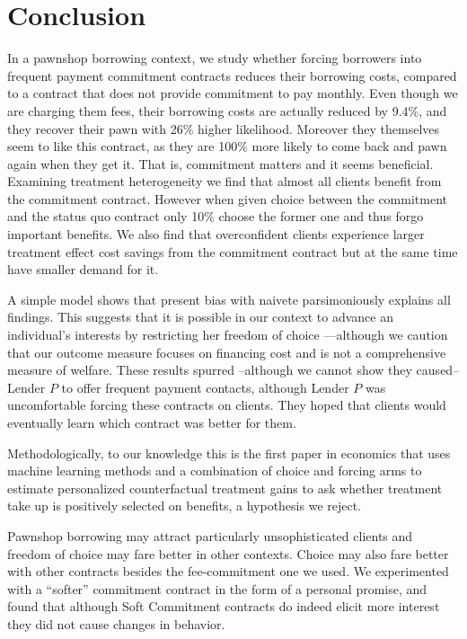 \documentclass[oneside,11pt]{article}
\begin{document}
    
\section{Conclusion} \label{conclusion}

In a pawnshop borrowing context, we study whether forcing borrowers into frequent payment commitment contracts reduces their borrowing costs, compared to a contract that does not provide commitment to pay monthly. Even though we are charging them fees, their borrowing costs are actually reduced by 9.4\%, and they recover their pawn with 26\% higher likelihood. Moreover they themselves seem to like this contract, as they are 100\% more likely to come back and pawn again when they get it. That is, commitment matters and it seems beneficial. Examining treatment heterogeneity we find that almost all clients benefit from the commitment contract. However when given choice between the commitment and the status quo contract only 10\% choose the former one and thus forgo important benefits. We also find that overconfident clients experience larger treatment effect cost savings from the commitment contract but at the same time have smaller demand for it. 

A simple model shows that present bias with naivete parsimoniously explains all findings. This suggests that it is possible in our context to advance an individual's interests by restricting her freedom of choice ---although we caution that our outcome measure focuses on financing cost and is not a comprehensive measure of welfare. These results spurred --although we cannot show they caused-- Lender $P$ to offer frequent payment contacts, although Lender $P$ was uncomfortable forcing these contracts on clients. They hoped that clients would eventually learn which contract was better for them.

Methodologically, to our knowledge this is the first paper in economics that uses machine learning methods and a combination of choice and forcing arms to estimate personalized counterfactual treatment gains to ask whether treatment take up is positively selected on benefits, a hypothesis we reject.

Pawnshop borrowing may attract particularly unsophisticated clients and freedom of choice may fare better in other contexts. Choice may also fare better with other contracts besides the fee-commitment one we used. We experimented with a ``softer'' commitment contract in the form of a personal promise, and found that although Soft Commitment contracts do indeed elicit more interest they did not cause changes in behavior. 
\end{document}
